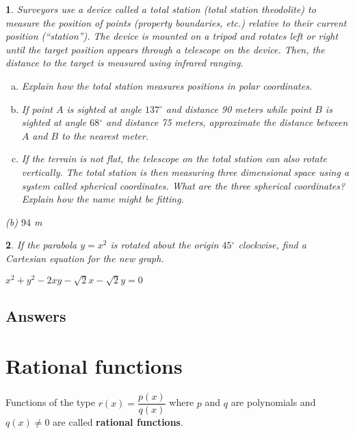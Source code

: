 \documentclass{amsbook}
\newcommand{\ssp}{\begin{enumerate}[(a), leftmargin=*]}
\newcommand{\esp}{\end{enumerate}}
\newtheorem{exc}{}
\newenvironment{ex}{\begin{exc}\normalfont}{\end{exc}}
\numberwithin{section}{chapter}
\numberwithin{equation}{chapter}
\newcommand{\dg}{{^\circ}}
\begin{document}
\begin{ex}
	Surveyors use a device called a total station (total station theodolite) to measure the position of points (property boundaries, etc.) relative to their current position (``station''). The device is mounted on a tripod and rotates left or right until the target position appears through a telescope on the device. Then, the distance to the target is measured using infrared ranging.
	\ssp
	\item Explain how the total station measures positions in polar coordinates.
	\item If point $A$ is sighted at angle $137\dg$ and distance 90 meters while point $B$ is sighted at angle $68\dg$ and distance 75 meters, approximate the distance between $A$ and $B$ to the nearest meter.
	\item If the terrain is not flat, the telescope on the total station can also rotate vertically. The total station is then measuring three dimensional space using a system called spherical coordinates. What are the three spherical coordinates? Explain how the name might be fitting.
	\esp
	\begin{sol}
		(b) $94$ m
	\end{sol}
\end{ex}

\begin{ex}
	If the parabola $y=x^2$ is rotated about the origin $45\dg$ clockwise, find a Cartesian equation for the new graph.
	\begin{sol}
		$x^2+y^2-2xy-\sqrt{2}x-\sqrt{2}y=0$
	\end{sol}
\end{ex}


\subsection*{Answers \nopunct} \hfill
\begin{multicols}{2}
	
\end{multicols}



\newpage
\section{Rational functions}

Functions of the type $r(x) = \dfrac{p(x)}{q(x)}$ where $p$ and $q$ are polynomials and $q(x)\neq 0$ are called \textbf{rational functions}.
\end{document}
